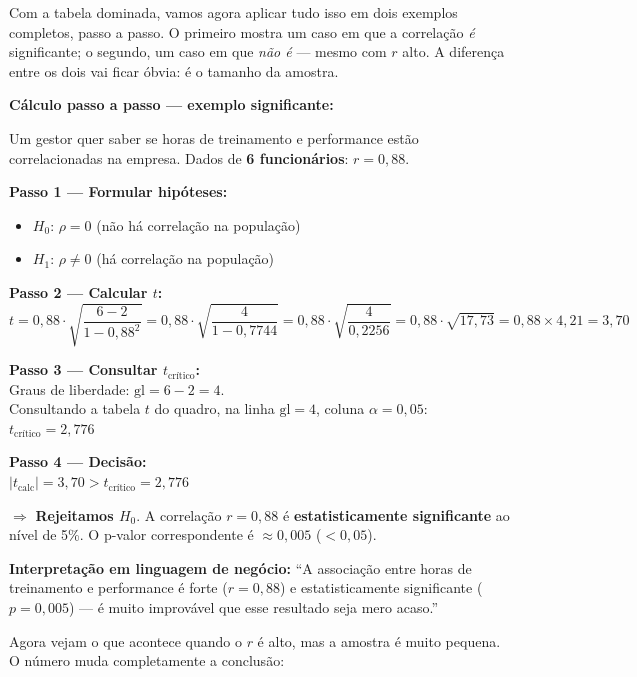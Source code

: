 Com a tabela dominada, vamos agora aplicar tudo isso em dois exemplos
completos, passo a passo.
O primeiro mostra um caso em que a correlação \emph{é} significante;
o segundo, um caso em que \emph{não é} — mesmo com $r$ alto.
A diferença entre os dois vai ficar óbvia: é o tamanho da amostra.

\begin{SolvedBox}
\textbf{Cálculo passo a passo — exemplo significante:}

Um gestor quer saber se horas de treinamento e performance estão
correlacionadas na empresa. Dados de \textbf{6 funcionários}: $r = 0{,}88$.

\textbf{Passo 1 — Formular hipóteses:}
\begin{itemize}
  \item $H_0$: $\rho = 0$ (não há correlação na população)
  \item $H_1$: $\rho \neq 0$ (há correlação na população)
\end{itemize}

\textbf{Passo 2 — Calcular $t$:}
\[
t = 0{,}88 \cdot \sqrt{\frac{6 - 2}{1 - 0{,}88^2}}
  = 0{,}88 \cdot \sqrt{\frac{4}{1 - 0{,}7744}}
  = 0{,}88 \cdot \sqrt{\frac{4}{0{,}2256}}
  = 0{,}88 \cdot \sqrt{17{,}73}
  = 0{,}88 \times 4{,}21
  = 3{,}70
\]

\textbf{Passo 3 — Consultar $t_{\text{crítico}}$:}\\
Graus de liberdade: $\text{gl} = 6 - 2 = 4$.\\
Consultando a tabela $t$ do quadro, na linha $\text{gl} = 4$, coluna
$\alpha = 0{,}05$:\\
$t_{\text{crítico}} = 2{,}776$

\textbf{Passo 4 — Decisão:}\\
$|t_{\text{calc}}| = 3{,}70 > t_{\text{crítico}} = 2{,}776$

$\Rightarrow$ \textbf{Rejeitamos $H_0$}.
A correlação $r = 0{,}88$ é \textbf{estatisticamente significante} ao nível
de 5\%. O p-valor correspondente é $\approx 0{,}005$ ($< 0{,}05$).

\textbf{Interpretação em linguagem de negócio:}
``A associação entre horas de treinamento e performance é forte
($r = 0{,}88$) e estatisticamente significante ($p = 0{,}005$) — é muito
improvável que esse resultado seja mero acaso.''
\end{SolvedBox}

Agora vejam o que acontece quando o $r$ é alto, mas a amostra é muito
pequena.
O número muda completamente a conclusão:


